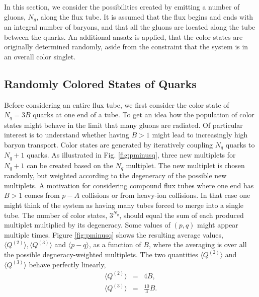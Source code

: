 \documentclass[aps, prc, 12pt, nofootinbib, showpacs, superscriptaddress, tightenlines, groupedaddress]{revtex4-2}
\begin{document}
In this section, we consider the possibilities created by emitting a number of gluons, $N_g$, along the flux tube. It is assumed that the flux begins and ends with an integral number of baryons, and that all the gluons are located along the tube between the quarks. An additional ansatz is applied, that the color states are originally determined randomly, aside from the constraint that the system is in an overall color singlet.

\subsection{Randomly Colored States of Quarks}

Before considering an entire flux tube, we first consider the color state of $N_q=3B$ quarks at one end of a tube. To get an idea how the population of color states might behave in the limit that many gluons are radiated. Of particular interest is to understand whether having $B>1$ might lead to increasingly high baryon transport. Color states are generated by iteratively coupling $N_q$ quarks to $N_q+1$ quarks. As illustrated in Fig. \ref{fig:pminusq}, three new multiplets for $N_q+1$ can be created based on the $N_q$ multiplet. The new multiplet is chosen randomly, but weighted according to the degeneracy of the possible new multiplets. A motivation for considering compound flux tubes where one end has $B>1$ comes from $p-A$ collisions or from heavy-ion collisions. In that case one might think of the system as having many tubes forced to merge into a single tube. The number of color states, $3^{N_q}$, should equal the sum of each produced multiplet multiplied by its degeneracy. Some values of $(p,q)$ might appear multiple times. Figure \ref{fig:pminusq} shows the resulting average values, $\langle Q^{(2)}\rangle, \langle Q^{(3)}\rangle$ and $\langle p-q\rangle$, as a function of $B$, where the averaging is over all the possible degneracy-weighted multiplets. The two quantities $\langle Q^{(2)}\rangle$ and  $\langle Q^{(3)}\rangle$ behave perfectly linearly,
\begin{eqnarray}
\langle Q^{(2)}\rangle&=&4B,\\
\langle Q^{(3)}\rangle&=&\frac{10}{3}B.
\end{eqnarray}
\end{document}
